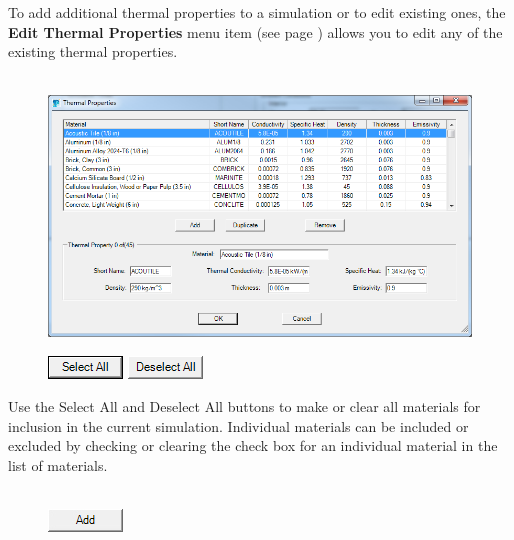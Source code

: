 To add additional thermal properties to a simulation or to edit existing ones, the \textbf{Edit Thermal Properties} menu item (see page \pageref{Thermal_Properties_Menu}) allows you to edit any of the existing thermal properties. \\~ \\

\begin{figure}[h!]
\begin{center}
\includegraphics[width=6.5in]{FIGURES/Input_File/Edit_Thermal_Properties}
\end{center}
\end{figure}

\begin{figure}
  \includegraphics[width=0.781in]{FIGURES/Input_File/Select_All_Button}
  \includegraphics[width=0.781in]{FIGURES/Input_File/Deselect_All_Button}
\end{figure}

Use the Select All and Deselect All buttons to make or clear all materials for inclusion in the current simulation.  Individual materials can be included or excluded by checking or clearing the check box for an individual material in the list of materials. \\~ \\

\begin{figure}
  \includegraphics[width=0.781in]{FIGURES/Input_File/Add_Button}
\end{figure}

